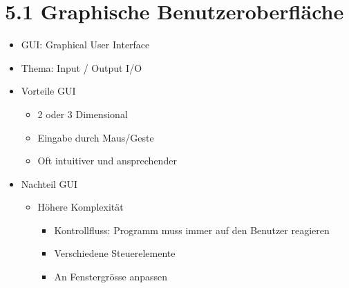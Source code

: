 \documentclass[11pt]{article}
\begin{document}
\section{5.1 Graphische Benutzeroberfläche}
\label{sec:org700a1f2}
\begin{itemize}
\item GUI: Graphical User Interface\\
\item Thema: Input / Output I/O\\

\item Vorteile GUI\\
\begin{itemize}
\item 2 oder 3 Dimensional\\
\item Eingabe durch Maus/Geste\\
\item Oft intuitiver und ansprechender\\
\end{itemize}

\item Nachteil GUI\\
\begin{itemize}
\item Höhere Komplexität\\
\begin{itemize}
\item Kontrollfluss: Programm muss immer auf den Benutzer reagieren\\
\item Verschiedene Steuerelemente\\
\item An Fenstergrösse anpassen\\
\end{itemize}
\end{itemize}
\end{itemize}
\end{document}
